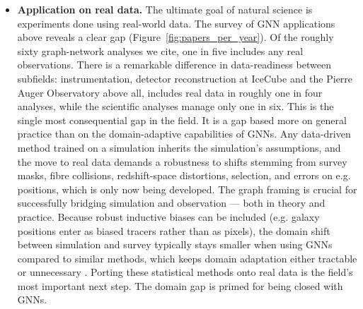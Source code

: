 \documentclass[graybox, envcountchap]{Template/svmult}
\begin{document}
\begin{itemize}
    \item \textbf{Application on real data.} The ultimate goal of natural science is experiments done using real-world data. The survey of GNN applications above reveals a clear gap (Figure~\ref{fig:papers_per_year}). Of the roughly sixty graph-network analyses we cite, one in five includes any real observations. There is a remarkable difference in data-readiness between subfields: instrumentation, detector reconstruction at IceCube and the Pierre Auger Observatory above all, includes real data in roughly one in four analyses, while the scientific analyses manage only one in six. This is the single most consequential gap in the field. It is a gap based more on general practice than on the domain-adaptive capabilities of GNNs. Any data-driven method trained on a simulation inherits the simulation's assumptions, and the move to real data demands a robustness to shifts stemming from survey masks, fibre collisions, redshift-space distortions, selection, and errors on e.g. positions, which is only now being developed. The graph framing is crucial for successfully bridging simulation and observation --- both in theory and practice. Because robust inductive biases can be included (e.g. galaxy positions enter as biased tracers rather than as pixels), the domain shift between simulation and survey typically stays smaller when using GNNs compared to similar methods, which keeps domain adaptation either tractable or unnecessary \citep{deSanti2023_fieldlevel_LFI, Roncoli2023_domainadaptation_cosmology, Lee2024_SDSS_domaingeneralization}. Porting these statistical methods onto real data is the field's most important next step. The domain gap is primed for being closed with GNNs.

\end{itemize}
\end{document}
